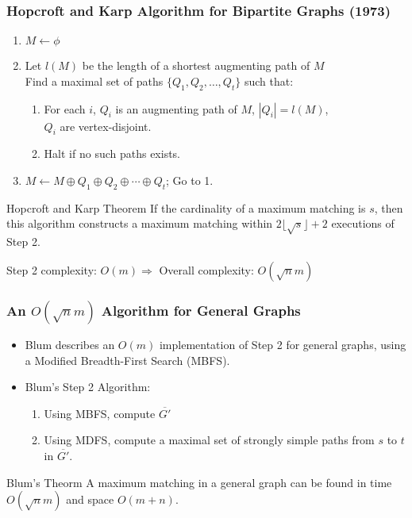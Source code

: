 \documentclass[pdftex]{beamer}
\begin{document}
\begin{frame} \frametitle{Hopcroft and Karp Algorithm for Bipartite
    Graphs (1973)}
  \vspace{-2ex}
  \begin{enumerate}
  \item $M \leftarrow \phi$
  \item Let $l(M)$ be the length of a shortest augmenting path of
    $M$\\
    Find a maximal set of paths $\{Q_1, Q_2, \ldots, Q_t\}$ such that:
    \begin{enumerate}[2.1]
    \item For each $i$, $Q_i$ is an augmenting path of $M$, $|Q_i| =
      l(M)$,\\
      $Q_i$ are vertex-disjoint.
    \item Halt if no such paths exists.
    \end{enumerate}
  \item $M \leftarrow M \oplus Q_1 \oplus Q_2 \oplus \cdots \oplus
    Q_t$; Go to 1.
  \end{enumerate}
  \begin{block}{Hopcroft and Karp Theorem}
    If the cardinality of a maximum matching is $s$, then this
    algorithm constructs a maximum matching within $2 \lfloor\sqrt{s}\rfloor
    + 2$ executions of Step 2.
  \end{block}
  \vspace{-1ex}
  \begin{center}
    Step 2 complexity: $O(m) \Rightarrow$ Overall complexity:
    $O(\sqrt{n} m)$
  \end{center}
\end{frame}

\begin{frame} \frametitle{An $O(\sqrt{n} m)$ Algorithm for General
    Graphs}
  \begin{itemize}
  \item Blum describes an $O(m)$ implementation of Step 2 for general
    graphs, using a Modified Breadth-First Search (MBFS).

  \item Blum's Step 2 Algorithm:
    \begin{enumerate}
    \item Using MBFS, compute $\overline{G'}$
    \item Using MDFS, compute a maximal set of strongly simple paths
      from $s$ to $t$ in $\overline{G'}$.
    \end{enumerate}
  \end{itemize}
  \begin{block}{Blum's Theorm}
    A maximum matching in a general graph can be found in time
    $O(\sqrt{n} m)$ and space $O(m+n)$.
  \end{block}
\end{frame}
\end{document}
